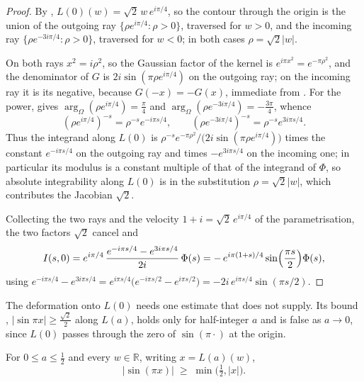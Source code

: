 \begin{proof}
\leanok
{}
By , $L(0)(w)=\sqrt2\,w\,e^{i\pi/4}$, so the contour through the origin is
the union of the outgoing ray $\{\rho e^{i\pi/4}:\rho>0\}$, traversed for $w>0$, and the
incoming ray $\{\rho e^{-3i\pi/4}:\rho>0\}$, traversed for $w<0$; in both cases
$\rho=\sqrt2\lvert w\rvert$.

On both rays $x^{2}=i\rho^{2}$, so the Gaussian factor of the kernel is
$e^{i\pi x^{2}}=e^{-\pi\rho^{2}}$, and the denominator of $G$ is $2i\sin(\pi\rho e^{i\pi/4})$ on
the outgoing ray; on the incoming ray it is its negative, because $G(-x)=-G(x)$,
immediate from .  For the power,  gives
$\arg_{\Omega}(\rho e^{i\pi/4})=\tfrac\pi4$ and $\arg_{\Omega}(\rho e^{-3i\pi/4})=-\tfrac{3\pi}4$,
whence
\[
  (\rho e^{i\pi/4})^{-s}=\rho^{-s}e^{-i\pi s/4},\qquad
  (\rho e^{-3i\pi/4})^{-s}=\rho^{-s}e^{3i\pi s/4}.
\]
Thus the integrand along $L(0)$ is $\rho^{-s}e^{-\pi\rho^{2}}/\bigl(2i\sin(\pi\rho e^{i\pi/4})\bigr)$
times the constant $e^{-i\pi s/4}$ on the outgoing ray and times $-e^{3i\pi s/4}$ on the incoming
one; in particular its modulus is a constant multiple of that of the integrand of $\Phi$, so
absolute integrability along $L(0)$ is  in the substitution
$\rho=\sqrt2\lvert w\rvert$, which contributes the Jacobian $\sqrt2$.

Collecting the two rays and the velocity $1+i=\sqrt2\,e^{i\pi/4}$ of the parametrisation, the two
factors $\sqrt2$ cancel and
\[
  I(s,0)=e^{i\pi/4}\,\frac{e^{-i\pi s/4}-e^{3i\pi s/4}}{2i}\,\Phi(s)
       =-\,e^{i\pi(1+s)/4}\sin\Bigl(\frac{\pi s}{2}\Bigr)\Phi(s),
\]
using $e^{-i\pi s/4}-e^{3i\pi s/4}=e^{i\pi s/4}\bigl(e^{-i\pi s/2}-e^{i\pi s/2}\bigr)
=-2i\,e^{i\pi s/4}\sin(\pi s/2)$.
\end{proof}

The deformation onto $L(0)$ needs one estimate that  does not supply.
Its bound , $\lvert\sin\pi x\rvert\ge\tfrac{\sqrt2}2$ along $L(a)$, holds only for half-integer $a$
and is false as $a\to0$, since $L(0)$ passes through the zero of $\sin(\pi\cdot)$ at the origin.

\begin{lemma}
\label{lem:rsz_sin_lb}
\leanok
{}
For $0\le a\le\tfrac12$ and every $w\in\mathbb{R}$, writing $x=L(a)(w)$,
\[
  \lvert\sin(\pi x)\rvert\;\ge\;\min\bigl(\tfrac12,\lvert x\rvert\bigr).
\]
\end{lemma}

